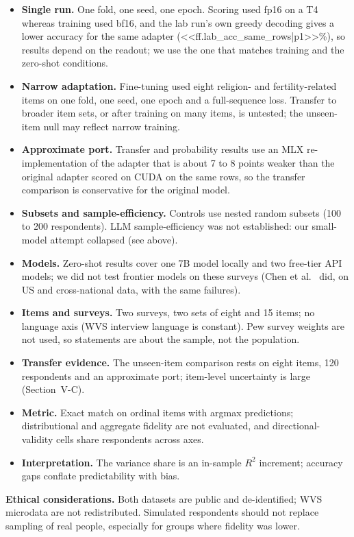\documentclass[conference]{IEEEtran}
\begin{document}
\begin{itemize}
    \item \textbf{Single run.} One fold, one seed, one epoch. Scoring used fp16 on a T4 whereas training used bf16, and the lab run's own greedy decoding gives a lower accuracy for the same adapter (<<ff.lab_acc_same_rows|p1>>\%), so results depend on the readout; we use the one that matches training and the zero-shot conditions.
    \item \textbf{Narrow adaptation.} Fine-tuning used eight religion- and fertility-related items on one fold, one seed, one epoch and a full-sequence loss. Transfer to broader item sets, or after training on many items, is untested; the unseen-item null may reflect narrow training.
    \item \textbf{Approximate port.} Transfer and probability results use an MLX re-implementation of the adapter that is about 7 to 8 points weaker than the original adapter scored on CUDA on the same rows, so the transfer comparison is conservative for the original model.
    \item \textbf{Subsets and sample-efficiency.} Controls use nested random subsets (100 to 200 respondents). LLM sample-efficiency was not established: our small-model attempt collapsed (see above).
    \item \textbf{Models.} Zero-shot results cover one 7B model locally and two free-tier API models; we did not test frontier models on these surveys (Chen et al.~\cite{chen2026} did, on US and cross-national data, with the same failures).
    \item \textbf{Items and surveys.} Two surveys, two sets of eight and 15 items; no language axis (WVS interview language is constant). Pew survey weights are not used, so statements are about the sample, not the population.
    \item \textbf{Transfer evidence.} The unseen-item comparison rests on eight items, 120 respondents and an approximate port; item-level uncertainty is large (Section~V-C).
    \item \textbf{Metric.} Exact match on ordinal items with argmax predictions; distributional and aggregate fidelity are not evaluated, and directional-validity cells share respondents across axes.
    \item \textbf{Interpretation.} The variance share is an in-sample $R^2$ increment; accuracy gaps conflate predictability with bias.
\end{itemize}

\textbf{Ethical considerations.} Both datasets are public and de-identified; WVS microdata are not redistributed. Simulated respondents should not replace sampling of real people, especially for groups where fidelity was lower.
\end{document}
